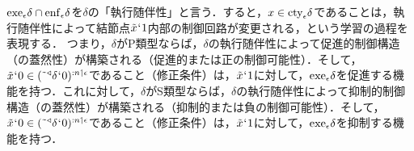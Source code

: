 \noindent $ \mathrm{exe}_{\epsilon}\delta\cap\mathrm{enf}_{\epsilon}\delta $を$ \delta $の「執行随伴性」と言う．すると，$x\in\mathrm{cty}_{\epsilon}\delta$であることは，執行随伴性によって結節点$\tilde{x}{\mspace{1mu}{`}\mspace{1mu}} 1$内部の制御回路が変更される，という学習の過程を表現する．
つまり，$\delta$がP類型ならば，$\delta$の執行随伴性によって促進的制御構造（の蓋然性）が構築される（促進的または正の制御可能性）．そして，$\tilde{x}{\mspace{1mu}{`}\mspace{1mu}} 0\in(\tilde{\:\:}{^\triangleleft}\delta{\mspace{1mu}{`}\mspace{1mu}} 0)^{:n\mathbin{\upharpoonleft}\epsilon}$であること（修正条件）は，$\tilde{x}{\mspace{1mu}{`}\mspace{1mu}} 1$に対して，$\mathrm{exe}_{\epsilon}\delta$を促進する機能を持つ．これに対して，$\delta$がS類型ならば，$\delta$の執行随伴性によって抑制的制御構造（の蓋然性）が構築される（抑制的または負の制御可能性）．そして，$\tilde{x}{\mspace{1mu}{`}\mspace{1mu}} 0\in(\tilde{\:\:}{^\triangleleft}\delta{\mspace{1mu}{`}\mspace{1mu}} 0)^{:n\mathbin{\upharpoonleft}\epsilon}$であること（修正条件）は，$\tilde{x}{\mspace{1mu}{`}\mspace{1mu}} 1$に対して，$\mathrm{exe}_{\epsilon}\delta$を抑制する機能を持つ．


